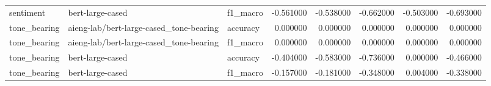 \begin{tabular}{lllrrrrr}
sentiment & bert-large-cased & f1_macro & -0.561000 & -0.538000 & -0.662000 & -0.503000 & -0.693000 \\
tone_bearing & aieng-lab/bert-large-cased_tone-bearing & accuracy & 0.000000 & 0.000000 & 0.000000 & 0.000000 & 0.000000 \\
tone_bearing & aieng-lab/bert-large-cased_tone-bearing & f1_macro & 0.000000 & 0.000000 & 0.000000 & 0.000000 & 0.000000 \\
tone_bearing & bert-large-cased & accuracy & -0.404000 & -0.583000 & -0.736000 & 0.000000 & -0.466000 \\
tone_bearing & bert-large-cased & f1_macro & -0.157000 & -0.181000 & -0.348000 & 0.004000 & -0.338000 \\
\bottomrule
\end{tabular}
